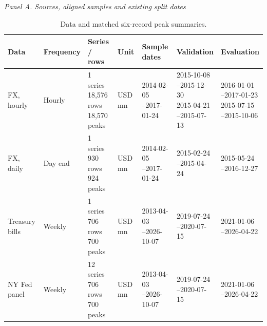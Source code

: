 \begin{table}[!htbp]
\centering
\caption{Data and matched six-record peak summaries.}\label{tab:v12-data}
\begingroup\scriptsize\setlength{\tabcolsep}{2.5pt}
\textit{Panel A. Sources, aligned samples and existing split dates}\\[3pt]
\begin{tabular}{@{}p{.13\linewidth}p{.09\linewidth}p{.11\linewidth}p{.08\linewidth}p{.15\linewidth}p{.16\linewidth}p{.16\linewidth}@{}}
\toprule
Data & Frequency & Series / rows & Unit & Sample dates & Validation & Evaluation \\
\midrule
FX, hourly & Hourly & \shortstack[l]{1 series\\18,576 rows\\18,570 peaks} & USD mn & \shortstack[l]{2014-02-05\\--2017-01-24} & \shortstack[l]{2015-10-08\\--2015-12-30\\2015-04-21\\--2015-07-13} & \shortstack[l]{2016-01-01\\--2017-01-23\\2015-07-15\\--2015-10-06} \\
FX, daily & Day end & \shortstack[l]{1 series\\930 rows\\924 peaks} & USD mn & \shortstack[l]{2014-02-05\\--2017-01-24} & \shortstack[l]{2015-02-24\\--2015-04-24} & \shortstack[l]{2015-05-24\\--2016-12-27} \\
Treasury bills & Weekly & \shortstack[l]{1 series\\706 rows\\700 peaks} & USD mn & \shortstack[l]{2013-04-03\\--2026-10-07} & \shortstack[l]{2019-07-24\\--2020-07-15} & \shortstack[l]{2021-01-06\\--2026-04-22} \\
NY Fed panel & Weekly & \shortstack[l]{12 series\\706 rows\\700 peaks} & USD mn & \shortstack[l]{2013-04-03\\--2026-10-07} & \shortstack[l]{2019-07-24\\--2020-07-15} & \shortstack[l]{2021-01-06\\--2026-04-22} \\

\end{tabular}
\end{table}
